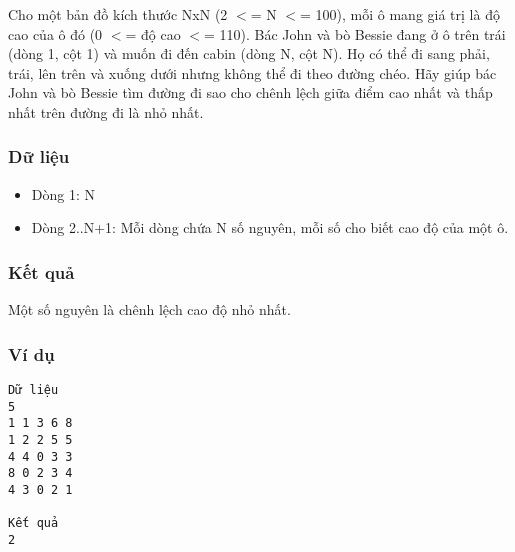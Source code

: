 



   Cho một bản đồ kích thước NxN (2 $<$= N $<$= 100), mỗi ô mang giá trị là độ cao của ô đó (0 $<$= độ cao $<$= 110). Bác John và bò Bessie đang ở ô trên trái (dòng 1, cột 1) và muốn đi đến cabin (dòng N, cột N). Họ có thể đi sang phải, trái, lên trên và xuống dưới nhưng không thể đi theo đường chéo. Hãy giúp bác John và bò Bessie tìm đường đi sao cho chênh lệch giữa điểm cao nhất và thấp nhất trên đường đi là nhỏ nhất.  

\subsubsection{   Dữ liệu  }
\begin{itemize}
	\item     Dòng 1: N   
	\item     Dòng 2..N+1: Mỗi dòng chứa N số nguyên, mỗi số cho biết cao độ của một ô.   
\end{itemize}

\subsubsection{   Kết quả  }

   Một số nguyên là chênh lệch cao độ nhỏ nhất.  

\subsubsection{   Ví dụ  }
\begin{verbatim}
Dữ liệu
5
1 1 3 6 8
1 2 2 5 5
4 4 0 3 3
8 0 2 3 4
4 3 0 2 1

Kết quả
2
\end{verbatim}